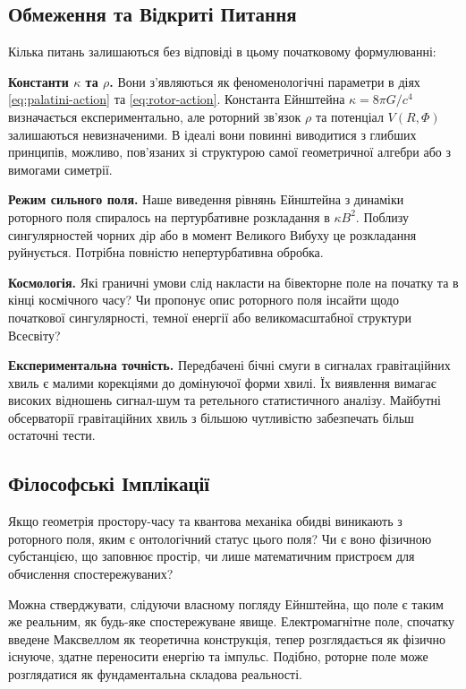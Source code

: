 \documentclass[11pt,a4paper]{article}
\numberwithin{equation}{section}
\theoremstyle{plain}
\theoremstyle{definition}
\theoremstyle{remark}
\begin{document}
\subsection{Обмеження та Відкриті Питання}

Кілька питань залишаються без відповіді в цьому початковому формулюванні:

\textbf{Константи $\kappa$ та $\rho$.} Вони з'являються як феноменологічні параметри в діях \eqref{eq:palatini-action} та \eqref{eq:rotor-action}. Константа Ейнштейна $\kappa = 8\pi G/c^4$ визначається експериментально, але роторний зв'язок $\rho$ та потенціал $V(R,\Phi)$ залишаються невизначеними. В ідеалі вони повинні виводитися з глибших принципів, можливо, пов'язаних зі структурою самої геометричної алгебри або з вимогами симетрії.

\textbf{Режим сильного поля.} Наше виведення рівнянь Ейнштейна з динаміки роторного поля спиралось на пертурбативне розкладання в $\kappa B^2$. Поблизу сингулярностей чорних дір або в момент Великого Вибуху це розкладання руйнується. Потрібна повністю непертурбативна обробка.

\textbf{Космологія.} Які граничні умови слід накласти на бівекторне поле на початку та в кінці космічного часу? Чи пропонує опис роторного поля інсайти щодо початкової сингулярності, темної енергії або великомасштабної структури Всесвіту?

\textbf{Експериментальна точність.} Передбачені бічні смуги в сигналах гравітаційних хвиль є малими корекціями до домінуючої форми хвилі. Їх виявлення вимагає високих відношень сигнал-шум та ретельного статистичного аналізу. Майбутні обсерваторії гравітаційних хвиль з більшою чутливістю забезпечать більш остаточні тести.

\subsection{Філософські Імплікації}

Якщо геометрія простору-часу та квантова механіка обидві виникають з роторного поля, яким є онтологічний статус цього поля? Чи є воно фізичною субстанцією, що заповнює простір, чи лише математичним пристроєм для обчислення спостережуваних?

Можна стверджувати, слідуючи власному погляду Ейнштейна, що поле є таким же реальним, як будь-яке спостережуване явище. Електромагнітне поле, спочатку введене Максвеллом як теоретична конструкція, тепер розглядається як фізично існуюче, здатне переносити енергію та імпульс. Подібно, роторне поле може розглядатися як фундаментальна складова реальності.
\end{document}
